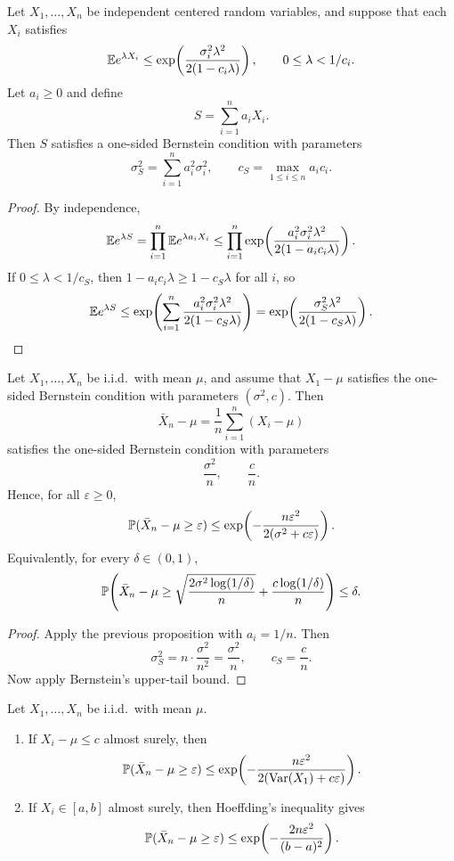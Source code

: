 \begin{prop}
Let $X_1,\dots,X_n$ be independent centered random variables, and suppose that each $X_i$ satisfies
\[
\mathbb{E} e^{\lambda X_i}
\le
\exp\!\left(\frac{\sigma_i^2\lambda^2}{2(1-c_i\lambda)}\right),
\qquad 0\le \lambda<1/c_i.
\]
Let $a_i\ge 0$ and define
\[
S=\sum_{i=1}^n a_i X_i.
\]
Then $S$ satisfies a one-sided Bernstein condition with parameters
\[
\sigma_S^2=\sum_{i=1}^n a_i^2\sigma_i^2,
\qquad
c_S=\max_{1\le i\le n} a_i c_i.
\]
\end{prop}

\begin{proof}
By independence,
\[
\mathbb{E} e^{\lambda S}
=
\prod_{i=1}^n \mathbb{E} e^{\lambda a_i X_i}
\le
\prod_{i=1}^n
\exp\!\left(\frac{a_i^2\sigma_i^2\lambda^2}{2(1-a_i c_i\lambda)}\right).
\]
If $0\le \lambda<1/c_S$, then $1-a_i c_i\lambda\ge 1-c_S\lambda$ for all $i$, so
\[
\mathbb{E} e^{\lambda S}
\le
\exp\!\left(
\sum_{i=1}^n
\frac{a_i^2\sigma_i^2\lambda^2}{2(1-c_S\lambda)}
\right)
=
\exp\!\left(
\frac{\sigma_S^2\lambda^2}{2(1-c_S\lambda)}
\right).
\]
\end{proof}

\begin{cor}
Let $X_1,\dots,X_n$ be i.i.d.\ with mean $\mu$, and assume that $X_1-\mu$ satisfies the one-sided Bernstein condition with parameters $(\sigma^2,c)$. Then
\[
\bar X_n-\mu
=
\frac1n\sum_{i=1}^n (X_i-\mu)
\]
satisfies the one-sided Bernstein condition with parameters
\[
\frac{\sigma^2}{n},
\qquad
\frac{c}{n}.
\]
Hence, for all $\varepsilon\ge 0$,
\[
\mathbb{P}(\bar X_n-\mu\ge \varepsilon)
\le
\exp\!\left(
-\frac{n\varepsilon^2}{2(\sigma^2+c\varepsilon)}
\right).
\]
Equivalently, for every $\delta\in(0,1)$,
\[
\mathbb{P}\!\left(
\bar X_n-\mu
\ge
\sqrt{\frac{2\sigma^2\log(1/\delta)}{n}}
+
\frac{c\log(1/\delta)}{n}
\right)\le \delta.
\]
\end{cor}

\begin{proof}
Apply the previous proposition with $a_i=1/n$. Then
\[
\sigma_S^2
=
n\cdot \frac{\sigma^2}{n^2}
=
\frac{\sigma^2}{n},
\qquad
c_S
=
\frac{c}{n}.
\]
Now apply Bernstein's upper-tail bound.
\end{proof}

\begin{cor}
Let $X_1,\dots,X_n$ be i.i.d.\ with mean $\mu$.

\begin{enumerate}[label=(\alph*)]
    \item If $X_i-\mu\le c$ almost surely, then
    \[
    \mathbb{P}(\bar X_n-\mu\ge \varepsilon)
    \le
    \exp\!\left(
    -\frac{n\varepsilon^2}{2(\operatorname{Var}(X_1)+c\varepsilon)}
    \right).
    \]

    \item If $X_i\in[a,b]$ almost surely, then Hoeffding's inequality gives
    \[
    \mathbb{P}(\bar X_n-\mu\ge \varepsilon)
    \le
    \exp\!\left(
    -\frac{2n\varepsilon^2}{(b-a)^2}
    \right).
    \]
\end{enumerate}
\end{cor}

